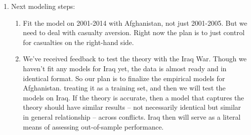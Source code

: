 \begin{enumerate}
	\item Next modeling steps:
	\begin{enumerate}
		\item Fit the model on 2001-2014 with Afghanistan, not just 2001-2005. But we need to deal with casualty aversion. Right now the plan is to just control for casualties on the right-hand side.
		\item We've received feedback to test the theory with the Iraq War. Though we haven't fit any models for Iraq yet, the data is almost ready and in identical format. So our plan is to finalize the empirical models for Afghanistan. treating it as a training set, and then we will test the models on Iraq. If the theory is accurate, then a model that captures the theory should have similar results -- not necessarily identical but similar in general relationship -- across conflicts. Iraq then will serve as a literal means of assessing out-of-sample performance.
	\end{enumerate}
\end{enumerate}
